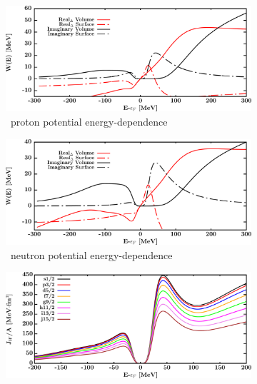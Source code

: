 \begin{figure}[hbtp]
    \begin{subfigure}[b]{0.45\textwidth}
        \centering
        \includegraphics[width=\linewidth]{figures/ca48_protonPotentials.png}
        \caption{\caEight\ proton potential energy-dependence}
        \label{DOMFitData_ca48_proton_potentialComponent_energy}
    \end{subfigure}\hspace{6pt}
    \begin{subfigure}[b]{0.45\linewidth}
        \centering
        \includegraphics[width=\linewidth]{figures/ca48_neutronPotentials.png}
        \caption{\caEight\ neutron potential energy-dependence}
        \label{DOMFitData_ca48_neutron_potentialComponent_energy}
    \end{subfigure}\vspace{0.3in}
    \begin{subfigure}[b]{0.45\textwidth}
        \centering
        \includegraphics[width=\linewidth]{figures/ca48_protonVolumeIntegrals.png}

\end{subfigure}
\end{figure}
